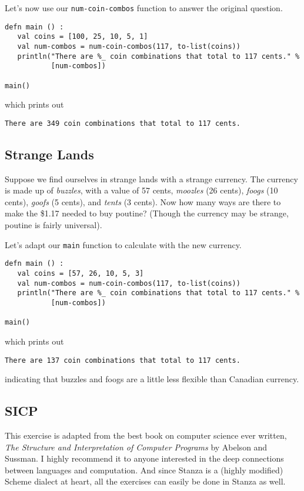 \documentclass[10pt,oneside]{book}
\begin{document}
Let's now use our \texttt{\frenchspacing num-coin-combos} function to answer the original question.
\begin{lstlisting}
defn main () :
   val coins = [100, 25, 10, 5, 1]
   val num-combos = num-coin-combos(117, to-list(coins))
   println("There are %_ coin combinations that total to 117 cents." %
           [num-combos])

main()
\end{lstlisting}
which prints out
\begin{lstlisting}
There are 349 coin combinations that total to 117 cents.
\end{lstlisting}

\subsection*{Strange Lands}
Suppose we find ourselves in strange lands with a strange currency. The currency is made up of {\em buzzles}, with a value of 57 cents, {\em moozles} (26 cents), {\em foogs} (10 cents), {\em goofs} (5 cents), and {\em tents} (3 cents). Now how many ways are there to make the \$1.17 needed to buy poutine? (Though the currency may be strange, poutine is fairly universal). 

Let's adapt our \texttt{\frenchspacing main} function to calculate with the new currency.
\begin{lstlisting}
defn main () :
   val coins = [57, 26, 10, 5, 3]
   val num-combos = num-coin-combos(117, to-list(coins))
   println("There are %_ coin combinations that total to 117 cents." %
           [num-combos])

main()
\end{lstlisting}
which prints out
\begin{lstlisting}
There are 137 coin combinations that total to 117 cents.
\end{lstlisting}
indicating that buzzles and foogs are a little less flexible than Canadian currency.

\subsection*{SICP}
This exercise is adapted from the best book on computer science ever written, {\em The Structure and Interpretation of Computer Programs} by Abelson and Sussman. I highly recommend it to anyone interested in the deep connections between languages and computation. And since Stanza is a (highly modified) Scheme dialect at heart, all the exercises can easily be done in Stanza as well.
\end{document}
